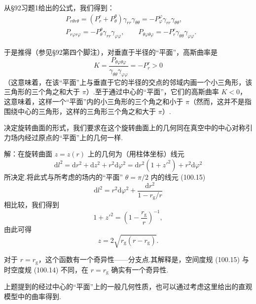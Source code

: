 \begin{xiti}
从§92习题1给出的公式，我们得到：
\begin{equation*}
\begin{aligned}
  &P_{r\theta r\theta}=(P_r^r+P_\theta^\theta)\gamma_{rr}\gamma_{\theta\theta}
  =-P_{\varphi}^{\varphi}\gamma_{rr}\gamma_{\theta\theta},\\
  &P_{r\varphi r\varphi}=-P_{\theta}^{\theta}\gamma_{rr}\gamma_{\varphi\varphi},
  \qquad
  P_{\theta\varphi\theta\varphi}
  =-P_r^r\gamma_{\theta\theta}\gamma_{\varphi\varphi}.
\end{aligned}
\end{equation*}

于是推得（参见§92第四个脚注），对垂直于半径的“平面”，高斯曲率是
\begin{equation*}
  K=\frac{P_{\theta\varphi\theta\varphi}}
  {\gamma_{\theta\theta}\gamma_{\varphi\varphi}}
  =-P_r^r>0
\end{equation*}
（这意味着，在该“平面”上与垂直于它的半径的交点的邻域内画一个小三角形，该三角形的三个角之和大于 $\pi$）.至于通过中心的“平面”，它们的高斯曲率 $K<0$，这意味着，这样一个“平面”内的小三角形的三个角之和小于 $\pi$（然而，这并不是指围绕中心的三角形，这样的三角形三个角之和大于 $\pi$）.

\quad 决定旋转曲面的形式，我们要求在这个旋转曲面上的几何同在真空中的中心对称引力场内经过原点的“平面”上的几何一样.

解：在旋转曲面 $z=z(r)$ 上的几何为（用柱体坐标）线元
\begin{equation*}
  \mathrm{d}l^{2}=\mathrm{d}r^{2}+\mathrm{d}z^{2}+r^{2}\mathrm{d}\varphi^{2}
  =\mathrm{d}r^{2}(1+z'^{2})+r^{2}\mathrm{d}\varphi^{2}
\end{equation*}
所决定.将此式与所考虑的场内的“平面” $\theta=\pi/2$ 内的线元 (100.15)
\begin{equation*}
  \mathrm{d}l^{2}=r^{2}\mathrm{d}\varphi^{2}
  +\frac{\mathrm{d}r^{2}}{1-r_{\mathrm{g}}/r}
\end{equation*}
相比较，我们得到
\begin{equation*}
  1+z'^{2}=\left(1-\frac{r_{\mathrm{g}}}{r}\right)^{-1},
\end{equation*}
由此可得
\begin{equation*}
  z=2\sqrt{r_{\mathrm{g}}(r-r_{\mathrm{g}})}.
\end{equation*}

对于 $r=r_{\mathrm{g}}$，这个函数有一个奇异性——分支点.其解释是，空间度规 (100.15) 与时空度规 (100.14) 不同，在 $r=r_{\mathrm{g}}$ 确实有一个奇异性.

上题提到的经过中心的“平面”上的一般几何性质，也可以通过考虑这里给出的直观模型中的曲率得到.


\end{xiti}

